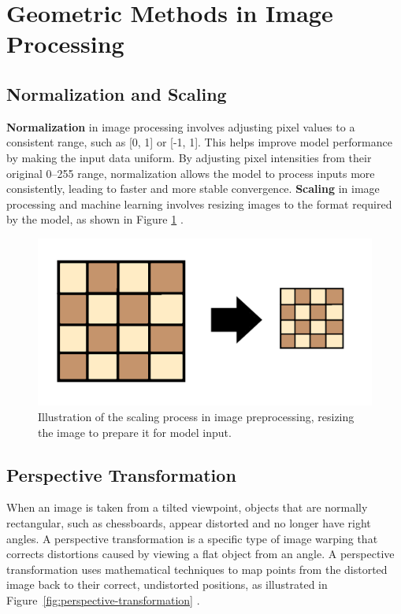 \section{Geometric Methods in Image Processing}
\label{sec:geometric-methods}

\subsection*{Normalization and Scaling}
\label{subsec:normalization-and-scaling}

\textbf{Normalization} in image processing involves adjusting pixel values to a consistent range, such as [0, 1] or [-1, 1]. This helps improve model performance by making the input data uniform. By adjusting pixel intensities from their original 0–255 range, normalization allows the model to process inputs more consistently, leading to faster and more stable convergence.
\textbf{Scaling} in image processing and machine learning involves resizing images to the format required by the model, as shown in Figure \ref{fig:scaling} \cite{brownlee:normalization}. 

\begin{figure}[h!]
    \centering
    \includegraphics[width=0.75\linewidth]{figures/theory/image-recognition/scaling.png}
    \caption[Scaling before and after]{Illustration of the scaling process in image preprocessing, resizing the image to prepare it for model input.}
    \label{fig:scaling}
\end{figure}

\subsection{Perspective Transformation}
\label{subsec:perspective-transformation}

When an image is taken from a tilted viewpoint, objects that are normally rectangular, such as chessboards, appear distorted and no longer have right angles. A perspective transformation is a specific type of image warping that corrects distortions caused by viewing a flat object from an angle. A perspective transformation uses mathematical techniques to map points from the distorted image back to their correct, undistorted positions, as illustrated in Figure~\ref{fig:perspective-transformation} \cite{nvidia:perspective-transform}.

